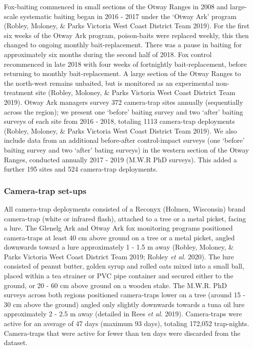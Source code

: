 \documentclass[11pt,a4paper,titlepage,twoside,openright]{style/unimelbthesis}
\begin{document}
\begin{mainmatter}
Fox-baiting commenced in small sections of the Otway Ranges in 2008 and large-scale systematic baiting began in 2016 - 2017 under the `Otway Ark' program (Robley, Moloney, \& Parks Victoria West Coast District Team 2019). For the first six weeks of the Otway Ark program, poison-baits were replaced weekly, this then changed to ongoing monthly bait-replacement. There was a pause in baiting for approximately six months during the second half of 2018. Fox control recommenced in late 2018 with four weeks of fortnightly bait-replacement, before returning to monthly bait-replacement. A large section of the Otway Ranges to the north-west remains unbaited, but is monitored as an experimental non-treatment site (Robley, Moloney, \& Parks Victoria West Coast District Team 2019). Otway Ark managers survey 372 camera-trap sites annually (sequentially across the region); we present one `before' baiting survey and two `after' baiting surveys of each site from 2016 - 2018, totaling 1113 camera-trap deployments (Robley, Moloney, \& Parks Victoria West Coast District Team 2019). We also include data from an additional before-after control-impact surveys (one `before' baiting survey and two `after' bating surveys) in the western section of the Otway Ranges, conducted annually 2017 - 2019 (M.W.R PhD surveys). This added a further 195 sites and 524 camera-trap deployments.

\hypertarget{camera-trap-set-ups}{%
\subsubsection{Camera-trap set-ups}\label{camera-trap-set-ups}}

All camera-trap deployments consisted of a Reconyx (Holmen, Wisconsin) brand camera-trap (white or infrared flash), attached to a tree or a metal picket, facing a lure. The Glenelg Ark and Otway Ark fox monitoring programs positioned camera-traps at least 40 cm above ground on a tree or a metal picket, angled downwards toward a lure approximately 1 - 1.5 m away (Robley, Moloney, \& Parks Victoria West Coast District Team 2019; Robley \emph{et al.} 2020). The lure consisted of peanut butter, golden syrup and rolled oats mixed into a small ball, placed within a tea strainer or PVC pipe container and secured either to the ground, or 20 - 60 cm above ground on a wooden stake. The M.W.R. PhD surveys across both regions positioned camera-traps lower on a tree (around 15 - 30 cm above the ground) angled only slightly downwards towards a tuna oil lure approximately 2 - 2.5 m away (detailed in Rees \emph{et al.} 2019). Camera-traps were active for an average of 47 days (maximum 93 days), totaling 172,052 trap-nights. Camera-traps that were active for fewer than ten days were discarded from the dataset.


\end{mainmatter}
\end{document}
